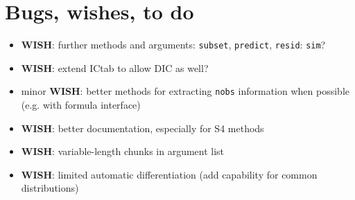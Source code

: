 \documentclass{article}
\newcommand{\code}[1]{{\tt #1}}
\begin{document}
\section*{Bugs, wishes, to do}
\begin{itemize}
\item \textbf{WISH}: further methods and arguments: \code{subset},
  \code{predict}, \code{resid}: \code{sim}?
\item \textbf{WISH}: extend ICtab to allow DIC as well?
\item minor \textbf{WISH}: 
  better methods for extracting \code{nobs} information
  when possible (e.g. with formula interface)
\item \textbf{WISH}: better documentation, especially for S4 methods
\item \textbf{WISH}: variable-length chunks in argument list
\item \textbf{WISH}: limited automatic differentiation
    (add capability for common distributions)
\end{itemize}


\end{document}
